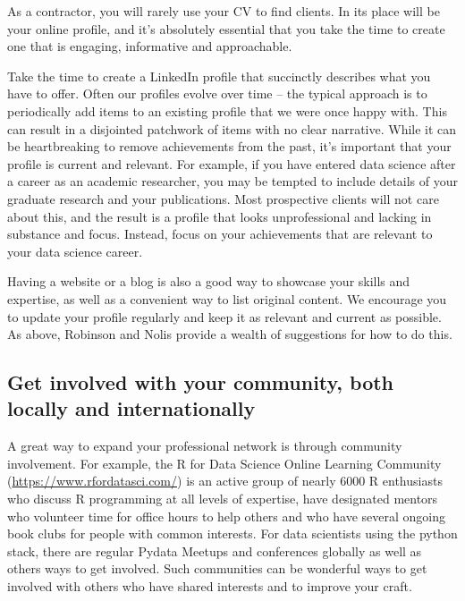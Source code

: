 \documentclass[
]{book}
\begin{document}
As a contractor, you will rarely use your CV to find clients. In its place will be your online profile, and it's absolutely essential that you take the time to create one that is engaging, informative and approachable.

Take the time to create a LinkedIn profile that succinctly describes what you have to offer. Often our profiles evolve over time -- the typical approach is to periodically add items to an existing profile that we were once happy with. This can result in a disjointed patchwork of items with no clear narrative. While it can be heartbreaking to remove achievements from the past, it's important that your profile is current and relevant. For example, if you have entered data science after a career as an academic researcher, you may be tempted to include details of your graduate research and your publications. Most prospective clients will not care about this, and the result is a profile that looks unprofessional and lacking in substance and focus. Instead, focus on your achievements that are relevant to your data science career.

Having a website or a blog is also a good way to showcase your skills and expertise, as well as a convenient way to list original content. We encourage you to update your profile regularly and keep it as relevant and current as possible. As above, Robinson and Nolis provide a wealth of suggestions for how to do this.

\hypertarget{get-involved-with-your-community-both-locally-and-internationally}{%
\subsection{Get involved with your community, both locally and internationally}\label{get-involved-with-your-community-both-locally-and-internationally}}

A great way to expand your professional network is through community involvement. For example, the R for Data Science Online Learning Community (\url{https://www.rfordatasci.com/}) is an active group of nearly 6000 R enthusiasts who discuss R programming at all levels of expertise, have designated mentors who volunteer time for office hours to help others and who have several ongoing book clubs for people with common interests. For data scientists using the python stack, there are regular Pydata Meetups and conferences globally as well as others ways to get involved. Such communities can be wonderful ways to get involved with others who have shared interests and to improve your craft.
\end{document}

